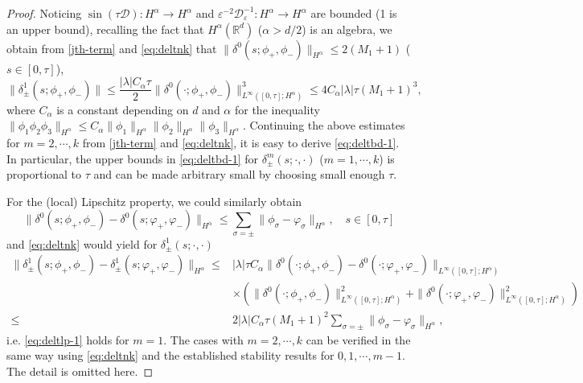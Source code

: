 \documentclass[final,leqno,showlabe]{siamltex}
\begin{document}
\begin{proof} Noticing   $\sin(\tau\mathcal{D}): H^\alpha\to H^\alpha$ and $\varepsilon^{-2}\mathcal{D}_\varepsilon^{-1}: H^\alpha\to H^\alpha$ are bounded (1 is an upper bound),  recalling the fact that $H^\alpha(\mathbb{R}^d)$ ($\alpha>d/2$) is an algebra, we obtain from  \eqref{jth-term}  and \eqref{eq:deltnk} that $\|\delta^0(s;\phi_+,\phi_-)\|_{H^\alpha}\leq 2(M_1+1)$ ($s\in[0,\tau]$),
\begin{equation*}
\|\delta_\pm^1(s;\phi_+,\phi_-)\|\leq \frac{|\lambda|C_\alpha \tau}{2}\|\delta^0(\cdot;\phi_+,\phi_-)\|_{L^\infty([0,\tau];H^\alpha)}^3\leq 4C_\alpha|\lambda|\tau(M_1+1)^3,
\end{equation*}
where $C_\alpha$ is a constant depending on $d$ and $\alpha$ for the inequality $\|\phi_1\phi_2\phi_3\|_{H^\alpha}\leq C_\alpha \|\phi_1\|_{H^\alpha}\|\phi_2\|_{H^\alpha}\|\phi_3\|_{H^\alpha}$.
Continuing  the above estimates for $m=2,\cdots,k$ from \eqref{jth-term}  and \eqref{eq:deltnk}, it is easy to derive \eqref{eq:deltbd-1}. In particular, the upper bounds in \eqref{eq:deltbd-1} for $\delta_{\pm}^m(s;\cdot,\cdot)$ ($m=1,\cdots,k$) is proportional to $\tau$ and can be made arbitrary small  by choosing small enough $\tau$.

For the (local) Lipschitz property, we could similarly obtain
\begin{equation*}
\|\delta^0(s;\phi_+,\phi_-)-\delta^0(s;\varphi_+,\varphi_-)\|_{H^\alpha}\leq \sum\limits_{\sigma=\pm}\|\phi_\sigma-\varphi_\sigma\|_{H^\alpha}, \quad s\in[0,\tau]
\end{equation*}
and \eqref{eq:deltnk} would yield for $\delta^1_\pm(s;\cdot,\cdot)$
\begin{align*}
\|\delta^1_\pm(s;\phi_+,\phi_-)-\delta^1_\pm(s;\varphi_+,\varphi_-)\|_{H^\alpha} \leq &|\lambda|\tau C_\alpha \|\delta^0(\cdot;\phi_+,\phi_-)-\delta^0(\cdot;\varphi_+,\varphi_-)\|_{L^\infty([0,\tau]; H^\alpha)}\\
&\times\left( \|\delta^0(\cdot;\phi_+,\phi_-)\|_{L^\infty([0,\tau]; H^\alpha)}^2+
\|\delta^0(\cdot;\varphi_+,\varphi_-)\|_{L^\infty([0,\tau]; H^\alpha)}^2\right)\\
\leq &2|\lambda|C_\alpha\tau (M_1+1)^2 \sum\limits_{\sigma=\pm}\|\phi_\sigma-\varphi_\sigma\|_{H^\alpha} ,
\end{align*}
i.e. \eqref{eq:deltlp-1} holds for $m=1$. The cases with $m=2,\cdots,k$ can be verified in the same way using \eqref{eq:deltnk} and the established stability results for $0,1,\cdots,m-1$. The detail is omitted here.
\end{proof}
\end{document}

